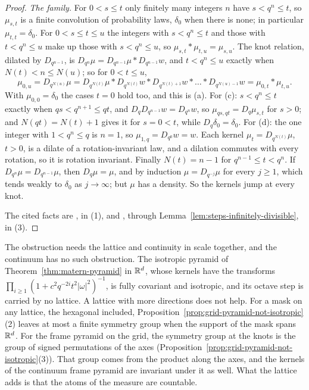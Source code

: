 \begin{proof}
\emph{The family.} For $0 < s \le t$ only finitely many integers $n$ have $s < q^n \le t$, so
$\mu_{s,t}$ is a finite convolution of probability laws, $\delta_0$ when there is none; in
particular $\mu_{t,t} = \delta_0$. For $0 < s \le t \le u$ the integers with $s < q^n \le t$ and
those with $t < q^n \le u$ make up those with $s < q^n \le u$, so
$\mu_{s,t} * \mu_{t,u} = \mu_{s,u}$. The knot relation, dilated by $D_{q^{n-1}}$, is
$D_{q^n}\mu = D_{q^{n-1}}\mu * D_{q^{n-1}}w$, and $t < q^n \le u$ exactly when
$N(t) < n \le N(u)$; so for $0 < t \le u$,
\[
  \mu_{0,u} = D_{q^{N(u)}}\mu
  = D_{q^{N(t)}}\mu * D_{q^{N(t)}}w * D_{q^{N(t)+1}}w * \dots * D_{q^{N(u)-1}}w
  = \mu_{0,t} * \mu_{t,u} .
\]
With $\mu_{0,0} = \delta_0$ the cases $t = 0$ hold too, and this is (a).
For (c): $s < q^n \le t$ exactly when $qs < q^{n+1} \le qt$, and
$D_qD_{q^{n-1}}w = D_{q^n}w$, so $\mu_{qs,qt} = D_q\mu_{s,t}$ for $s > 0$; and $N(qt) = N(t) + 1$
gives it for $s = 0 < t$, while $D_q\delta_0 = \delta_0$. For (d): the one integer with
$1 < q^n \le q$ is $n = 1$, so $\mu_{1,q} = D_{q^0}w = w$. Each kernel $\mu_t = D_{q^{N(t)}}\mu$,
$t > 0$, is a dilate of a rotation-invariant law, and a dilation commutes with every rotation, so
it is rotation invariant. Finally $N(t) = n - 1$ for $q^{n-1} \le t < q^n$. If
$D_{q^n}\mu = D_{q^{n-1}}\mu$, then $D_q\mu = \mu$, and by induction $\mu = D_{q^{-j}}\mu$ for every
$j \ge 1$, which tends weakly to $\delta_0$ as $j \to \infty$; but $\mu$ has a density. So the
kernels jump at every knot.

The cited facts are , in (1), and , through
Lemma~\ref{lem:steps-infinitely-divisible}, in (3).
\end{proof}

The obstruction needs the lattice and continuity in scale together, and the continuum has no such
obstruction. The isotropic \Matern{} pyramid
of Theorem~\ref{thm:matern-pyramid} in $\mathbb{R}^d$, whose kernels have the transforms
$\prod_{i \ge 1}(1 + c^2q^{-2i}t^2|\omega|^2)^{-1}$, is fully covariant and isotropic, and its
octave step is carried by no lattice. A lattice with more directions does not help. For a mask on
any lattice, the hexagonal included, Proposition~\ref{prop:grid-pyramid-not-isotropic}(2) leaves
at most a finite symmetry group when the support of the mask spans $\mathbb{R}^d$. For the frame \Matern{}
pyramid on the grid, the symmetry group at the knots is the group of signed permutations of the
axes (Proposition~\ref{prop:grid-pyramid-not-isotropic}(3)). That group comes from the product
along the axes, and the kernels of the continuum frame \Matern{} pyramid are invariant under it as
well. What the lattice adds is that the atoms of the \Levy{} measure are countable.

